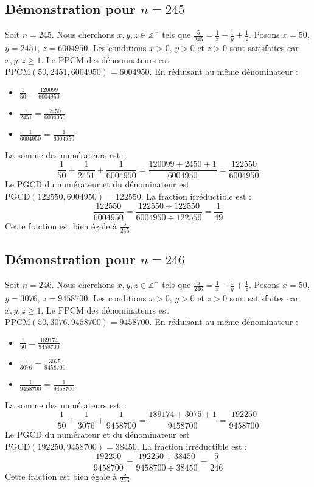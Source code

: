 \documentclass[11pt,a4paper]{article}
\begin{document}
\subsection{Démonstration pour $n = 245$}
Soit $n = 245$. Nous cherchons $x, y, z \in \mathbb{Z}^{+}$ tels que $\frac{5}{245} = \frac{1}{x} + \frac{1}{y} + \frac{1}{z}$.
Posons $x = 50$, $y = 2451$, $z = 6004950$.
Les conditions $x > 0$, $y > 0$ et $z > 0$ sont satisfaites car $x, y, z \geq 1$.
Le PPCM des dénominateurs est $\text{PPCM}(50, 2451, 6004950) = 6004950$.
En réduisant au même dénominateur :
\begin{itemize}
    \item $\frac{1}{50} = \frac{120099}{6004950}$
    \item $\frac{1}{2451} = \frac{2450}{6004950}$
    \item $\frac{1}{6004950} = \frac{1}{6004950}$
\end{itemize}
La somme des numérateurs est :
$$ \frac{1}{50} + \frac{1}{2451} + \frac{1}{6004950} = \frac{120099 + 2450 + 1}{6004950} = \frac{122550}{6004950} $$
Le PGCD du numérateur et du dénominateur est $\text{PGCD}(122550, 6004950) = 122550$.
La fraction irréductible est :
$$ \frac{122550}{6004950} = \frac{122550 \div 122550}{6004950 \div 122550} = \frac{1}{49} $$
Cette fraction est bien égale à $\frac{5}{245}$.

\subsection{Démonstration pour $n = 246$}
Soit $n = 246$. Nous cherchons $x, y, z \in \mathbb{Z}^{+}$ tels que $\frac{5}{246} = \frac{1}{x} + \frac{1}{y} + \frac{1}{z}$.
Posons $x = 50$, $y = 3076$, $z = 9458700$.
Les conditions $x > 0$, $y > 0$ et $z > 0$ sont satisfaites car $x, y, z \geq 1$.
Le PPCM des dénominateurs est $\text{PPCM}(50, 3076, 9458700) = 9458700$.
En réduisant au même dénominateur :
\begin{itemize}
    \item $\frac{1}{50} = \frac{189174}{9458700}$
    \item $\frac{1}{3076} = \frac{3075}{9458700}$
    \item $\frac{1}{9458700} = \frac{1}{9458700}$
\end{itemize}
La somme des numérateurs est :
$$ \frac{1}{50} + \frac{1}{3076} + \frac{1}{9458700} = \frac{189174 + 3075 + 1}{9458700} = \frac{192250}{9458700} $$
Le PGCD du numérateur et du dénominateur est $\text{PGCD}(192250, 9458700) = 38450$.
La fraction irréductible est :
$$ \frac{192250}{9458700} = \frac{192250 \div 38450}{9458700 \div 38450} = \frac{5}{246} $$
Cette fraction est bien égale à $\frac{5}{246}$.
\end{document}

